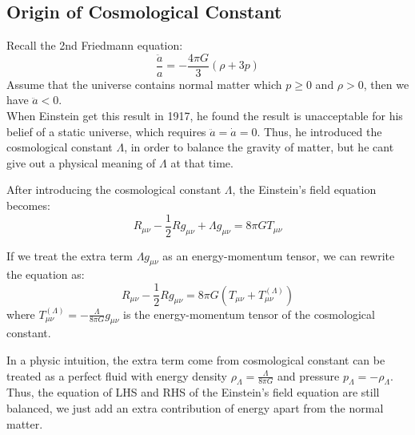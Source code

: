 \subsection{Origin of Cosmological Constant}
\begin{intuition}
    Recall the 2nd Friedmann equation:
    \[
        \frac{\ddot{a}}{a} = -\frac{4\pi G}{3}(\rho + 3p) 
    \]
    Assume that the universe contains normal matter which $p \geq 0$ and $\rho > 0$, then we have $\ddot{a} < 0$. \\

    When Einstein get this result in 1917, he found the result is unacceptable for his belief of a static universe, which requires $\ddot{a} = \dot{a} = 0$. Thus, he introduced the cosmological constant $\Lambda$, in order to balance the gravity of matter, but he cant give out a physical meaning of $\Lambda$ at that time. \\
\end{intuition}


\bigskip \noindent
\begin{foundation}
    After introducing the cosmological constant $\Lambda$, the Einstein's field equation becomes:
    \[
        R_{\mu\nu} - \frac{1}{2}Rg_{\mu\nu} + \Lambda g_{\mu\nu} = 8\pi G T_{\mu\nu}
    \]

    If we treat the extra term $\Lambda g_{\mu\nu}$ as an energy-momentum tensor, we can rewrite the equation as:
    \[
        R_{\mu\nu} - \frac{1}{2}Rg_{\mu\nu} = 8\pi G (T_{\mu\nu} + T^{(\Lambda)}_{\mu\nu})
    \]
    where $T^{(\Lambda)}_{\mu\nu} = -\frac{\Lambda}{8\pi G} g_{\mu\nu}$ is the energy-momentum tensor of the cosmological constant. \\
\end{foundation}

\bigskip \noindent
\begin{intuition}
    In a physic intuition, the extra term come from cosmological constant can be treated as a perfect fluid with energy density $\rho_\Lambda = \frac{\Lambda}{8\pi G}$ and pressure $p_\Lambda = -\rho_\Lambda$. Thus, the equation of LHS and RHS of the Einstein's field equation are still balanced, we just add an extra contribution of energy apart from the normal matter. \\
\end{intuition}


